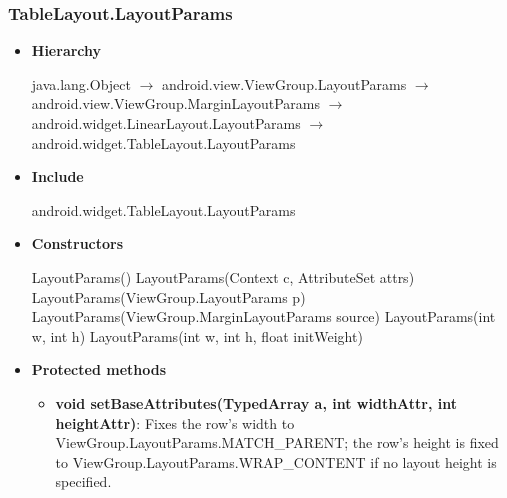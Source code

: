\documentclass{report}
\begin{document}
    \subsubsection{TableLayout.LayoutParams}
    \begin{itemize}
        \item \textbf{Hierarchy} 
            \begin{center}
                java.lang.Object $\to $	android.view.ViewGroup.LayoutParams $\to $	android.view.ViewGroup.MarginLayoutParams $\to $	android.widget.LinearLayout.LayoutParams $\to $	android.widget.TableLayout.LayoutParams
            \end{center}
        \item \textbf{Include}
            \bigbreak \noindent 
            \begin{javacode}
            android.widget.TableLayout.LayoutParams
            \end{javacode}
        \item \textbf{Constructors}
            \bigbreak \noindent 
            \begin{javacode}
                LayoutParams()
                LayoutParams(Context c, AttributeSet attrs)
                LayoutParams(ViewGroup.LayoutParams p)
                LayoutParams(ViewGroup.MarginLayoutParams source)
                LayoutParams(int w, int h)
                LayoutParams(int w, int h, float initWeight)
            \end{javacode}
        \item \textbf{Protected methods}
            \begin{itemize}
                \item \textbf{void setBaseAttributes(TypedArray a, int widthAttr, int heightAttr)}: Fixes the row's width to ViewGroup.LayoutParams.MATCH\_PARENT; the row's height is fixed to ViewGroup.LayoutParams.WRAP\_CONTENT if no layout height is specified.
            \end{itemize}
    \end{itemize}

    \pagebreak 
\end{document}
